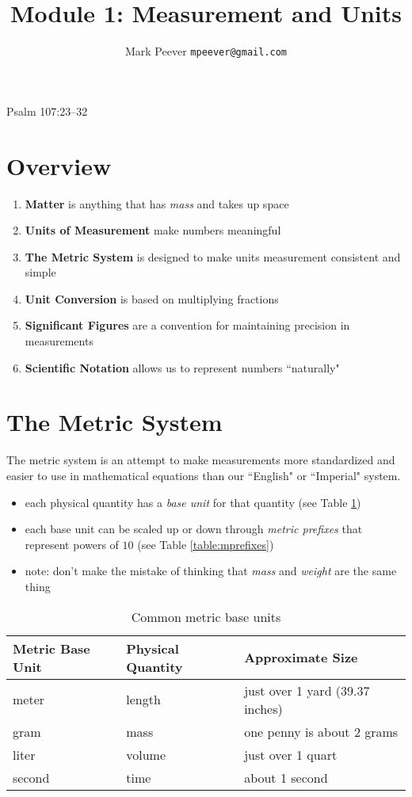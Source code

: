 \documentclass[11pt, oneside]{article}   	%
\title{Module 1: Measurement and Units}
\author{Mark Peever \texttt{mpeever@gmail.com}}
\begin{document}
\maketitle

\begin{center}
Psalm 107:23--32
\end{center}

\section{Overview}

\begin{enumerate}
\item \textbf{Matter} is anything that has \emph{mass} and takes up space
\item \textbf{Units of Measurement} make numbers meaningful
\item \textbf{The Metric System} is designed to make units measurement consistent and simple
\item \textbf{Unit Conversion} is based on multiplying fractions
\item \textbf{Significant Figures} are a convention for maintaining precision in measurements
\item \textbf{Scientific Notation} allows us to represent numbers ``naturally"   
\end{enumerate}



\section{The Metric System}
The metric system is an attempt to make measurements more standardized and easier to use in mathematical equations than our ``English" or ``Imperial" system.

\begin{itemize}
\item each physical quantity has a \emph{base unit} for that quantity \cite[p. 5]{wile-chem-2} (see Table \ref{table:mbaseunits})
\item each base unit can be scaled up or down through \emph{metric prefixes} that represent powers of $10$ \cite[p. 7]{wile-chem-2} (see Table \ref{table:mprefixes})
\item note: don't make the mistake of thinking that \emph{mass} and \emph{weight} are the same thing
\end{itemize}

\begin{table}
\centering
\begin{tabular}[b]{l | l| l}
\hline
Metric Base Unit & Physical Quantity & Approximate Size \\
\hline
meter     & length    & just over 1 yard (39.37 inches) \\
gram      & mass     & one penny is about 2 grams \\
liter         & volume & just over 1 quart \\
second   & time      & about 1 second \\
\end{tabular}
\caption{Common metric base units}
\label{table:mbaseunits}
\end{table}
\end{document}
